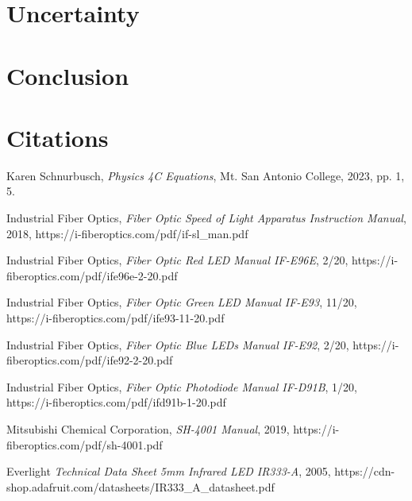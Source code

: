 \documentclass[12pt]{iopart} %
\begin{document}
\section{Uncertainty}

\section{Conclusion}

\section{Citations}

\begin{thebibliography}{9}

  Karen Schnurbusch,
  \textit{Physics 4C Equations},
  Mt. San Antonio College,
  2023,
  pp. 1, 5.

  Industrial Fiber Optics,
  \textit{Fiber Optic Speed of Light Apparatus Instruction Manual},
  2018,
  https://i-fiberoptics.com/pdf/if-sl\_man.pdf

  Industrial Fiber Optics,
  \textit{Fiber Optic Red LED Manual IF-E96E},
  2/20,
  https://i-fiberoptics.com/pdf/ife96e-2-20.pdf

  Industrial Fiber Optics,
  \textit{Fiber Optic Green LED Manual IF-E93},
  11/20,
  https://i-fiberoptics.com/pdf/ife93-11-20.pdf

  Industrial Fiber Optics,
  \textit{Fiber Optic Blue LEDs Manual IF-E92},
  2/20,
  https://i-fiberoptics.com/pdf/ife92-2-20.pdf

  Industrial Fiber Optics,
  \textit{Fiber Optic Photodiode Manual IF-D91B},
  1/20,
  https://i-fiberoptics.com/pdf/ifd91b-1-20.pdf

  Mitsubishi Chemical Corporation,
  \textit{SH-4001 Manual},
  2019,
  https://i-fiberoptics.com/pdf/sh-4001.pdf

  Everlight
  \textit{Technical Data Sheet 5mm Infrared LED IR333-A},
  2005,
  https://cdn-shop.adafruit.com/datasheets/IR333\_A\_datasheet.pdf

\end{thebibliography}
\end{document}
